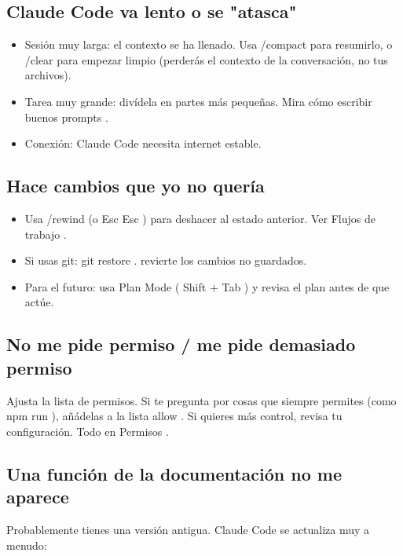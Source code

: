 \documentclass[11pt,a4paper]{book}
\begin{document}
\subsection{Claude Code va lento o se "atasca"}
\begin{itemize}\item Sesión muy larga: el contexto se ha llenado. Usa /compact para resumirlo, o /clear para empezar limpio (perderás el contexto de la conversación, no tus archivos).\end{itemize}
\begin{itemize}\item Tarea muy grande: divídela en partes más pequeñas. Mira cómo escribir buenos prompts .\end{itemize}
\begin{itemize}\item Conexión: Claude Code necesita internet estable.\end{itemize}
\subsection{Hace cambios que yo no quería}
\begin{itemize}\item Usa /rewind (o Esc Esc ) para deshacer al estado anterior. Ver Flujos de trabajo .\end{itemize}
\begin{itemize}\item Si usas git: git restore . revierte los cambios no guardados.\end{itemize}
\begin{itemize}\item Para el futuro: usa Plan Mode ( Shift + Tab ) y revisa el plan antes de que actúe.\end{itemize}
\subsection{No me pide permiso / me pide demasiado permiso}
Ajusta la lista de permisos. Si te pregunta por cosas que siempre permites (como npm run ), añádelas a la lista allow . Si quieres más control, revisa tu configuración. Todo en Permisos .

\subsection{Una función de la documentación no me aparece}
Probablemente tienes una versión antigua. Claude Code se actualiza muy a menudo:
\end{document}
